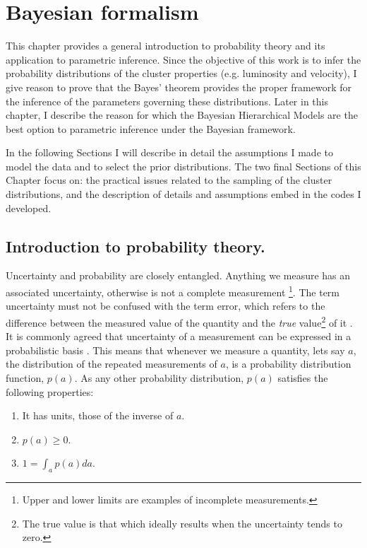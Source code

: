 \chapter{Bayesian formalism}
\label{chap:BHM}
This chapter provides a general introduction to probability theory and its application to parametric inference. Since the objective of this work is to infer the probability distributions of the cluster properties (e.g. luminosity and velocity), I give reason to prove that the Bayes' theorem provides the proper framework for the inference of the parameters governing these distributions. Later in this chapter, I describe the reason for which the Bayesian Hierarchical Models are the best option to parametric inference under the Bayesian framework.

In the following Sections I will describe in detail the assumptions I made to model the data and to select the prior distributions. The two final Sections of this Chapter focus on: the practical issues related to the sampling of the cluster distributions, and the description of details and assumptions embed in the codes I developed.

\section{Introduction to probability theory.}
 
Uncertainty and probability are closely entangled. Anything we measure has an associated uncertainty, otherwise is not a complete measurement \footnote{Upper and lower limits are examples of incomplete measurements.}. The term uncertainty must not be confused with the term error, which refers to the difference between the measured value of the quantity and the \emph{true} value\footnote{The true value is that which ideally results when the uncertainty tends to zero.} of it \citep{GUM2008}. It is commonly agreed that uncertainty of a measurement can be expressed in a probabilistic basis \citep{GUM2008}. This means that whenever we measure a quantity, lets say $a$, the distribution of the repeated measurements of $a$, is a probability distribution function, $p(a)$. As any other probability distribution, $p(a)$ satisfies the following properties:

\begin{enumerate}[label=\textbf{Property \arabic*}]
\item  It has units, those of the inverse of $a$. \label{property:1}
\item $p(a) \geq 0$. \label{property:3}
\item $1=\int_a p(a) da$. \label{property:3}
\end{enumerate}

